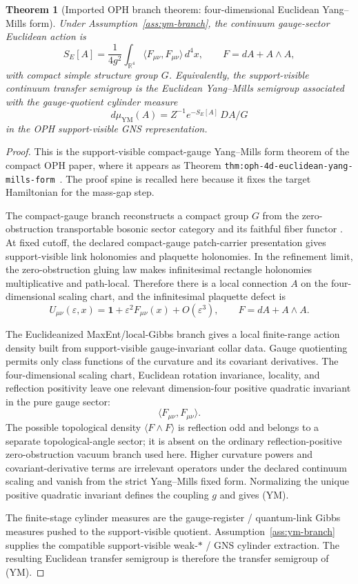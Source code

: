\documentclass[11pt]{article}
\numberwithin{equation}{section}
\newtheorem{theorem}{Theorem}[section]
\theoremstyle{remark}
\newcommand{\YM}{\mathrm{YM}}
\newcommand{\R}{\mathbb R}
\begin{document}
\begin{theorem}[Imported OPH branch theorem: four-dimensional Euclidean Yang--Mills form]
\label{thm:ym-form}
Under Assumption~\ref{ass:ym-branch}, the continuum gauge-sector Euclidean action is
\[
S_E[A]=\frac{1}{4g^2}\int_{\R^4}
\langle F_{\mu\nu},F_{\mu\nu}\rangle\,d^4x,
\qquad
F=dA+A\wedge A,
\tag{YM}
\]
with compact simple structure group \(G\). Equivalently, the support-visible continuum transfer
semigroup is the Euclidean Yang--Mills semigroup associated with the gauge-quotient cylinder
measure
\[
d\mu_{\YM}(A)=Z^{-1}e^{-S_E[A]}\,D A/G
\]
in the OPH support-visible GNS representation.
\end{theorem}

\begin{proof}
This is the support-visible compact-gauge Yang--Mills form theorem of the compact OPH paper,
where it appears as Theorem \texttt{thm:oph-4d-euclidean-yang-mills-form}~\cite{oph2}. The proof
spine is recalled here because it fixes the target Hamiltonian for the mass-gap step.

The compact-gauge branch reconstructs a compact group \(G\) from the zero-obstruction
transportable bosonic sector category and its faithful fiber functor
\cite{oph2}. At fixed cutoff, the declared compact-gauge patch-carrier presentation gives
support-visible link holonomies and plaquette holonomies. In the refinement limit, the
zero-obstruction gluing law makes infinitesimal rectangle holonomies multiplicative and
path-local. Therefore there is a local connection \(A\) on the four-dimensional scaling chart, and
the infinitesimal plaquette defect is
\[
U_{\mu\nu}(\varepsilon,x)
=
\mathbf 1+\varepsilon^2F_{\mu\nu}(x)+O(\varepsilon^3),
\qquad
F=dA+A\wedge A.
\]

The Euclideanized MaxEnt/local-Gibbs branch gives a local finite-range action density built from
support-visible gauge-invariant collar data. Gauge quotienting permits only class functions of
the curvature and its covariant derivatives. The four-dimensional scaling chart, Euclidean
rotation invariance, locality, and reflection positivity leave one relevant dimension-four
positive quadratic invariant in the pure gauge sector:
\[
\langle F_{\mu\nu},F_{\mu\nu}\rangle.
\]
The possible topological density \(\langle F\wedge F\rangle\) is reflection odd and belongs to a
separate topological-angle sector; it is absent on the ordinary reflection-positive
zero-obstruction vacuum branch used here. Higher curvature powers and covariant-derivative terms
are irrelevant operators under the declared continuum scaling and vanish from the strict
Yang--Mills fixed form. Normalizing the unique positive quadratic invariant defines the coupling
\(g\) and gives (YM).

The finite-stage cylinder measures are the gauge-register / quantum-link Gibbs measures pushed to
the support-visible quotient. Assumption~\ref{ass:ym-branch} supplies the compatible
support-visible weak-\(*\) / GNS cylinder extraction.
The resulting Euclidean transfer semigroup is therefore the transfer semigroup of (YM).
\end{proof}
\end{document}
